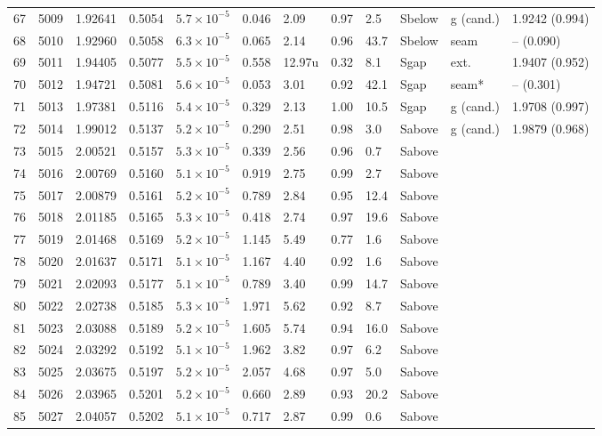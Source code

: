 \begin{longtable}{@{}rrllllllllll@{}}
 67 & 5009 & 1.92641 & 0.5054 & $5.7\times10^{-5}$ & 0.046 & 2.09 & 0.97 & 2.5 & Sbelow & g (cand.) & 1.9242 (0.994) \\
 68 & 5010 & 1.92960 & 0.5058 & $6.3\times10^{-5}$ & 0.065 & 2.14 & 0.96 & 43.7 & Sbelow & seam & -- (0.090) \\
 69 & 5011 & 1.94405 & 0.5077 & $5.5\times10^{-5}$ & 0.558 & 12.97u & 0.32 & 8.1 & Sgap & ext. & 1.9407 (0.952) \\
 70 & 5012 & 1.94721 & 0.5081 & $5.6\times10^{-5}$ & 0.053 & 3.01 & 0.92 & 42.1 & Sgap & seam* & -- (0.301) \\
 71 & 5013 & 1.97381 & 0.5116 & $5.4\times10^{-5}$ & 0.329 & 2.13 & 1.00 & 10.5 & Sgap & g (cand.) & 1.9708 (0.997) \\
 72 & 5014 & 1.99012 & 0.5137 & $5.2\times10^{-5}$ & 0.290 & 2.51 & 0.98 & 3.0 & Sabove & g (cand.) & 1.9879 (0.968) \\
 73 & 5015 & 2.00521 & 0.5157 & $5.3\times10^{-5}$ & 0.339 & 2.56 & 0.96 & 0.7 & Sabove &  &  \\
 74 & 5016 & 2.00769 & 0.5160 & $5.1\times10^{-5}$ & 0.919 & 2.75 & 0.99 & 2.7 & Sabove &  &  \\
 75 & 5017 & 2.00879 & 0.5161 & $5.2\times10^{-5}$ & 0.789 & 2.84 & 0.95 & 12.4 & Sabove &  &  \\
 76 & 5018 & 2.01185 & 0.5165 & $5.3\times10^{-5}$ & 0.418 & 2.74 & 0.97 & 19.6 & Sabove &  &  \\
 77 & 5019 & 2.01468 & 0.5169 & $5.2\times10^{-5}$ & 1.145 & 5.49 & 0.77 & 1.6 & Sabove &  &  \\
 78 & 5020 & 2.01637 & 0.5171 & $5.1\times10^{-5}$ & 1.167 & 4.40 & 0.92 & 1.6 & Sabove &  &  \\
 79 & 5021 & 2.02093 & 0.5177 & $5.1\times10^{-5}$ & 0.789 & 3.40 & 0.99 & 14.7 & Sabove &  &  \\
 80 & 5022 & 2.02738 & 0.5185 & $5.3\times10^{-5}$ & 1.971 & 5.62 & 0.92 & 8.7 & Sabove &  &  \\
 81 & 5023 & 2.03088 & 0.5189 & $5.2\times10^{-5}$ & 1.605 & 5.74 & 0.94 & 16.0 & Sabove &  &  \\
 82 & 5024 & 2.03292 & 0.5192 & $5.1\times10^{-5}$ & 1.962 & 3.82 & 0.97 & 6.2 & Sabove &  &  \\
 83 & 5025 & 2.03675 & 0.5197 & $5.2\times10^{-5}$ & 2.057 & 4.68 & 0.97 & 5.0 & Sabove &  &  \\
 84 & 5026 & 2.03965 & 0.5201 & $5.2\times10^{-5}$ & 0.660 & 2.89 & 0.93 & 20.2 & Sabove &  &  \\
 85 & 5027 & 2.04057 & 0.5202 & $5.1\times10^{-5}$ & 0.717 & 2.87 & 0.99 & 0.6 & Sabove &  &  \\

\end{longtable}
